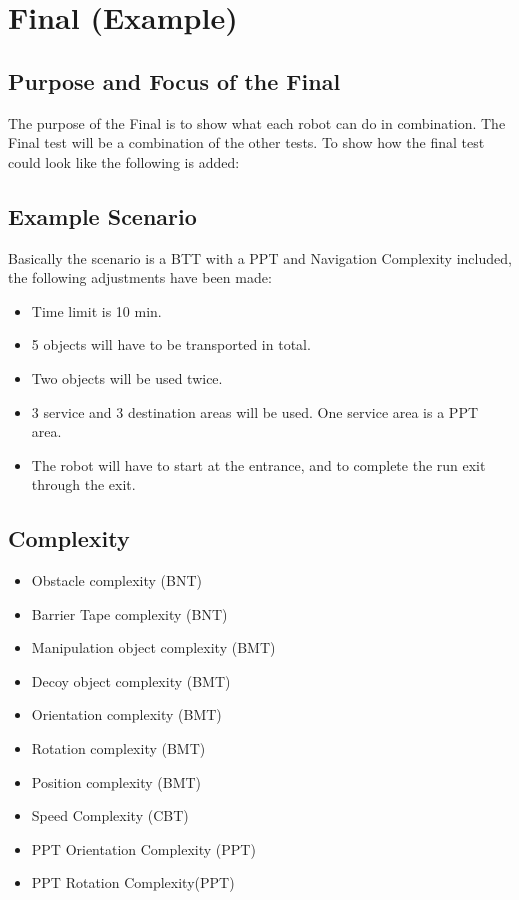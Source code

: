 \section{Final (Example)}

\subsection{Purpose and Focus of the Final}
The purpose of the Final is to show what each robot can do in combination. The Final test will be a combination of the other tests. To show how the final test could look like the following is added:

\subsection{Example Scenario}

Basically the scenario is a BTT with a PPT and Navigation Complexity included, the following adjustments have been made:

\begin{itemize}
\item Time limit is 10 min.
\item 5 objects will have to be transported in total.
\item Two objects will be used twice.
\item 3 service and 3 destination areas will be used. One service area is a PPT area.
\item The robot will have to start at the entrance, and to complete the run exit through the exit.
\end{itemize}


\subsection{Complexity}
	
\begin{itemize}
\item Obstacle complexity (BNT)
\item Barrier Tape complexity (BNT)
\item Manipulation object complexity (BMT)
\item Decoy object complexity (BMT)
\item Orientation complexity (BMT)
\item Rotation complexity (BMT)
\item Position complexity (BMT)
\item Speed Complexity (CBT)
\item PPT Orientation Complexity (PPT)
\item PPT Rotation Complexity(PPT)
\end{itemize}

